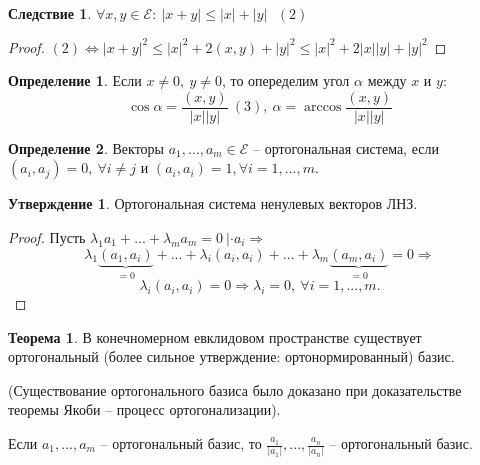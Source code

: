 \documentclass[a4paper, 12pt]{article}
\theoremstyle{definition}
\newtheorem*{definition}{Определение}
\newtheorem*{theorem}{Теорема}
\newtheorem*{consequense}{Следствие}
\newtheorem*{subtheorem}{Утверждение}
\begin{document}
    \begin{consequense}
        $\forall x,y \in \mathcal{E}:\ |x + y| \leq |x| + |y|
        \ \ \  (2)$
    \end{consequense}
    \begin{proof}
        $(2) \Longleftrightarrow |x + y|^2 \leq |x|^2 + 2(x,y)
        + |y|^2 \leq |x|^2 + 2|x||y| + |y|^2$ 

    \end{proof}
    \begin{definition}
        Если $x \neq 0,\ y \neq 0$, то опеределим угол
        $\alpha$ между $x \text{ и } y:$
        $$\cos \alpha = \frac{(x,y)}{|x||y|}\ (3),\ \alpha = 
        \arccos \frac{(x,y)}{|x||y|} $$
    \end{definition}
    \begin{definition}
        Векторы $a_1,...,a_m \in \mathcal{E}$ -- ортогональная
        система, если\\ $(a_i, a_j) = 0,\ \forall i \neq j$ и $
        (a_i,a_i) = 1,\forall i = 1,...,m.$ 
    \end{definition}
    \begin{subtheorem}
        Ортогональная система ненулевых векторов ЛНЗ.
    \end{subtheorem}
    \begin{proof}
        Пусть $\lambda_1a_1 + ... + \lambda_ma_m = 0\ |\cdot 
        a_i \Longrightarrow $
        $$\lambda_1\underbrace{(a_1,a_i)}_{ = 0} + ... + 
        \lambda_i(a_i,a_i) +...+ 
        \lambda_m\underbrace{(a_m,a_i)}_{= 0} = 0 
        \Longrightarrow $$
        $$\lambda_i(a_i,a_i) = 0 \Longrightarrow \lambda_i = 0,
        \ \forall i = 1,...,m.$$
    \end{proof}
    \begin{theorem}
        В конечномерном евклидовом пространстве существует
        ортогональный (более сильное утверждение: 
        ортонормированный) базис.
    \end{theorem}
    (Существование ортогонального базиса было доказано
    при доказательстве теоремы Якоби -- процесс 
    ортогонализации).

    Если $a_1,...,a_m$ -- ортогональный базис, то
    $\frac{a_1}{|a_1|},...,\frac{a_n}{|a_n|}$ -- 
    ортогональный базис.
\end{document}

